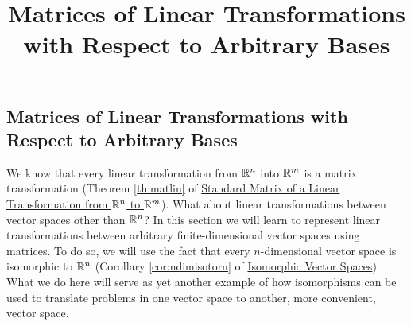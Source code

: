 \documentclass{ximera}
\title{Matrices of Linear Transformations with Respect to Arbitrary Bases} \license{CC BY-NC-SA 4.0}
\begin{document}
\begin{abstract}
 \end{abstract}
\maketitle

\begin{onlineOnly}
\section*{Matrices of Linear Transformations with Respect to Arbitrary Bases}
\end{onlineOnly}

We know that every linear transformation from $\mathbb{R}^n$ into $\mathbb{R}^m$ is a matrix transformation  (Theorem \ref{th:matlin} of \href{https://ximera.osu.edu/oerlinalg/LinearAlgebra/LTR-0020/main}{Standard Matrix of a Linear Transformation from $\mathbb{R}^n$ to $\mathbb{R}^m$}).  What about linear transformations between vector spaces other than $\mathbb{R}^n$?  In this section we will learn to represent linear transformations between arbitrary finite-dimensional vector spaces using matrices.  To do so, we will use the fact that every $n$-dimensional vector space is isomorphic to $\mathbb{R}^n$  (Corollary \ref{cor:ndimisotorn} of \href{https://ximera.osu.edu/oerlinalg/LinearAlgebra/LTR-0060/main}{Isomorphic Vector Spaces}).  What we do here will serve as yet another example of how isomorphisms can be used to translate problems in one vector space to another, more convenient, vector space.
\end{document}

